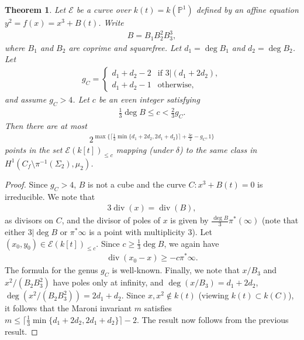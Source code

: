 \documentclass[11pt]{article}
\theoremstyle{plain}
\newtheorem{theorem}{Theorem}[section]
\theoremstyle{definition}
\DeclareMathOperator{\divisor}{div}
\newcommand{\PP}{\mathbb{P}}
\begin{document}
\begin{theorem}
\label{j0bound}
Let $\mathcal{E}$ be a curve over $k(t)=k(\PP^1)$ defined by an affine equation $y^2=f(x)=x^3+B(t)$.  Write
\begin{align*}
B=B_1B_2^2B_3^3,
\end{align*}
where $B_1$ and $B_2$ are coprime and squarefree. Let $d_1=\deg B_1$ and $d_2=\deg B_2$.  Let 
\begin{align*}
g_C=
\begin{cases}
d_1+d_2-2 &\text{if $3| (d_1+2d_2)$},\\
d_1+d_2-1 &\text{otherwise},
\end{cases}
\end{align*}
and assume $g_C>4$.
Let $c$ be an even integer satisfying
\begin{align*}
\frac{1}{3}\deg B\leq c<\frac{2}{3}g_C.
\end{align*}
Then there are at most 
\begin{align*}
2^{\max\{\lceil\frac{1}{3}\min\{d_1+2d_2,2d_1+d_2\}\rceil+\frac{3c}{2}-g_C,1\}}
\end{align*}
points in the set $\mathcal{E}(k[t])_{\leq c}$ mapping (under $\delta$) to the same class in $H^1(C_f\setminus \pi^{-1}(\Sigma_2),\mu_2)$.
\end{theorem}

\begin{proof}
Since $g_C>4$, $B$ is not a cube and the curve $C:x^3+B(t)=0$ is irreducible. We note that
\begin{align*}
3\divisor(x)=\divisor(B),
\end{align*}
as divisors on $C$, and the divisor of poles of $x$ is given by $\frac{\deg B}{3}\pi^*(\infty)$ (note that either $3|\deg B$ or $\pi^*\infty$ is a point with multiplicity $3$). Let $(x_0,y_0)\in \mathcal{E}(k[t])_{\leq c}$.  Since $c\geq \frac{1}{3}\deg B$, we again have
\begin{align*}
\divisor(x_0-x)\geq -c\pi^*\infty.
\end{align*}
The formula for the genus $g_C$ is well-known. Finally, we note that $x/B_3$ and $x^2/(B_2B_3^2)$ have poles only at infinity, and $\deg(x/B_3)=d_1+2d_2$, $\deg(x^2/(B_2B_3^2))=2d_1+d_2$. Since $x,x^2\not\in k(t)$ (viewing $k(t)\subset k(C)$), it follows that the Maroni invariant $m$ satisfies $m\leq \lceil\frac{1}{3}\min\{d_1+2d_2,2d_1+d_2\}\rceil-2$. The result now follows from the previous result.
\end{proof}
\end{document}
